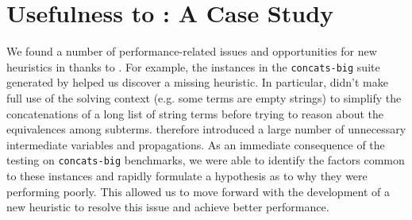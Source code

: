 \section{Usefulness to \us{}: A Case Study}
\label{sec:analysis}

We found a number of performance-related issues and opportunities for
new heuristics in \us{} thanks to \fuzzer{}. For example, the
instances in the \texttt{concats-big} suite generated by \fuzzer{}
helped us discover a missing heuristic. In particular, \us{} didn't
make full use of the solving context (e.g. some terms are empty
strings) to simplify the concatenations of a long list of string terms
before trying to reason about the equivalences among subterms. \us{}
therefore introduced a large number of unnecessary intermediate
variables and propagations. As an immediate consequence of the
testing \us{} on \texttt{concats-big} benchmarks, we were able to
identify the factors common to these instances and rapidly formulate a
hypothesis as to why they were performing poorly. This allowed us to
move forward with the development of a new heuristic to resolve this
issue and achieve better performance.



